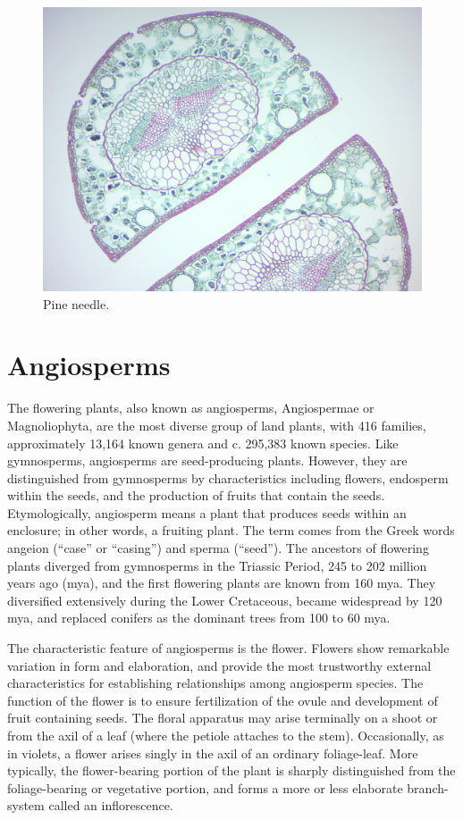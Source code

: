 \begin{figure}

{\centering \includegraphics[width=0.7\linewidth]{./figures/gymnosperms/pine_needle}

}

\caption{Pine needle.}\label{fig:needle}
\end{figure}

\section{Angiosperms}\label{angiosperms}

The flowering plants, also known as angiosperms, Angiospermae or
Magnoliophyta, are the most diverse group of land plants, with 416
families, approximately 13,164 known genera and c. 295,383 known
species. Like gymnosperms, angiosperms are seed-producing plants.
However, they are distinguished from gymnosperms by characteristics
including flowers, endosperm within the seeds, and the production of
fruits that contain the seeds. Etymologically, angiosperm means a plant
that produces seeds within an enclosure; in other words, a fruiting
plant. The term comes from the Greek words angeion (``case'' or
``casing'') and sperma (``seed''). The ancestors of flowering plants
diverged from gymnosperms in the Triassic Period, 245 to 202 million
years ago (mya), and the first flowering plants are known from 160 mya.
They diversified extensively during the Lower Cretaceous, became
widespread by 120 mya, and replaced conifers as the dominant trees from
100 to 60 mya.

The characteristic feature of angiosperms is the flower. Flowers show
remarkable variation in form and elaboration, and provide the most
trustworthy external characteristics for establishing relationships
among angiosperm species. The function of the flower is to ensure
fertilization of the ovule and development of fruit containing seeds.
The floral apparatus may arise terminally on a shoot or from the axil of
a leaf (where the petiole attaches to the stem). Occasionally, as in
violets, a flower arises singly in the axil of an ordinary foliage-leaf.
More typically, the flower-bearing portion of the plant is sharply
distinguished from the foliage-bearing or vegetative portion, and forms
a more or less elaborate branch-system called an inflorescence.

